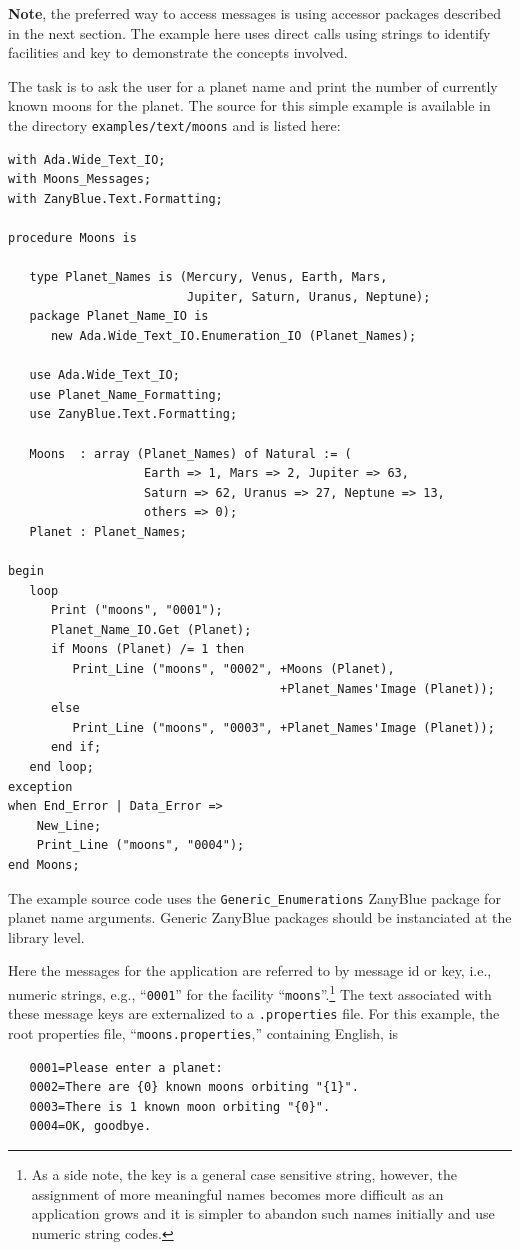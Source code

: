 \textbf{Note}, the preferred way to access messages is using accessor
packages described in the next section.   The example here uses direct
calls using strings to identify facilities and key to demonstrate the
concepts involved.

The task is to ask the user for a planet name and print the number of currently
known moons for the planet.  The source for this simple example
is available in the directory \texttt{examples/text/moons} and is listed here:
\begin{xmpl}
\begin{verbatim}
with Ada.Wide_Text_IO;
with Moons_Messages;
with ZanyBlue.Text.Formatting;

procedure Moons is

   type Planet_Names is (Mercury, Venus, Earth, Mars,
                         Jupiter, Saturn, Uranus, Neptune);
   package Planet_Name_IO is
      new Ada.Wide_Text_IO.Enumeration_IO (Planet_Names);

   use Ada.Wide_Text_IO;
   use Planet_Name_Formatting;
   use ZanyBlue.Text.Formatting;

   Moons  : array (Planet_Names) of Natural := (
                   Earth => 1, Mars => 2, Jupiter => 63,
                   Saturn => 62, Uranus => 27, Neptune => 13,
                   others => 0);
   Planet : Planet_Names;

begin
   loop
      Print ("moons", "0001");
      Planet_Name_IO.Get (Planet);
      if Moons (Planet) /= 1 then
         Print_Line ("moons", "0002", +Moons (Planet),
                                      +Planet_Names'Image (Planet));
      else
         Print_Line ("moons", "0003", +Planet_Names'Image (Planet));
      end if;
   end loop;
exception
when End_Error | Data_Error =>
    New_Line;
    Print_Line ("moons", "0004");
end Moons;
\end{verbatim}
\end{xmpl}
The example source code uses the \texttt{Generic\_Enumerations} ZanyBlue
package for planet name arguments.  Generic ZanyBlue packages should
be instanciated at the library level.

Here the messages for the application are referred to by message id or
key, i.e., numeric strings, e.g., ``\texttt{0001}'' for the facility
``\texttt{moons}''.\footnote{As a side note, the key is a general case
sensitive string, however, the assignment of more meaningful names becomes
more difficult as an application grows and it is simpler to abandon such
names initially and use numeric string codes.}
The text associated with these message keys are externalized to a
\texttt{.properties} file.  For this example, the root properties file,
``\texttt{moons.properties},'' containing English, is
\begin{xmpl}
\begin{verbatim}
   0001=Please enter a planet:
   0002=There are {0} known moons orbiting "{1}".
   0003=There is 1 known moon orbiting "{0}".
   0004=OK, goodbye.
\end{verbatim}
\end{xmpl}

